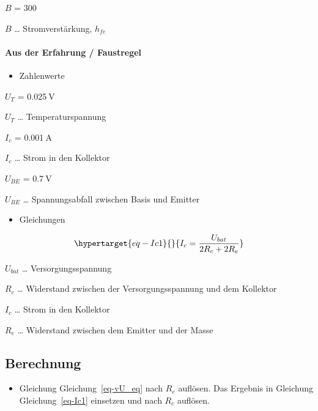 \documentclass[
  letterpaper,
  DIV=11]{scrreprt}
\let\oldparagraph\paragraph
\renewcommand{\paragraph}[1]{\oldparagraph{#1}\mbox{}}
\providecommand{\tightlist}{%
  \setlength{\itemsep}{0pt}\setlength{\parskip}{0pt}}\usepackage{longtable,booktabs,array}
\begin{document}
\(B\) = 300\(\ \mathtt{\text{}}\)

\(B\) \ldots{} Stromverstärkung, \(h_{fe}\)

\hypertarget{aus-der-erfahrung-faustregel}{%
\paragraph{Aus der Erfahrung /
Faustregel}\label{aus-der-erfahrung-faustregel}}

\begin{itemize}
\tightlist
\item
  Zahlenwerte
\end{itemize}

\(U_{T}\) = 0.025\(\ \text{V}\)

\(U_{T}\) \ldots{} Temperaturspannung

\(I_{c}\) = 0.001\(\ \text{A}\)

\(I_{c}\) \ldots{} Strom in den Kollektor

\(U_{BE}\) = 0.7\(\ \text{V}\)

\(U_{BE}\) \ldots{} Spannungsabfall zwischen Basis und Emitter

\begin{itemize}
\tightlist
\item
  Gleichungen
\end{itemize}

\begin{equation}\protect\hypertarget{eq-Ic1}{}{
I_{c} = \frac{U_{bat}}{2 R_{c} + 2 R_{e}}
}\label{eq-Ic1}\end{equation}

\(U_{bat}\) \ldots{} Versorgungsspannung

\(R_{c}\) \ldots{} Widerstand zwischen der Versorgungsspannung und dem
Kollektor

\(I_{c}\) \ldots{} Strom in den Kollektor

\(R_{e}\) \ldots{} Widerstand zwischen dem Emitter und der Masse

\hypertarget{berechnung}{%
\subsection{Berechnung}\label{berechnung}}

\begin{itemize}
\tightlist
\item
  Gleichung Gleichung~\ref{eq-vU_eq} nach \(R_e\) auflösen. Das Ergebnis
  in Gleichung Gleichung~\ref{eq-Ic1} einsetzen und nach \(R_c\)
  auflösen.
\end{itemize}
\end{document}
